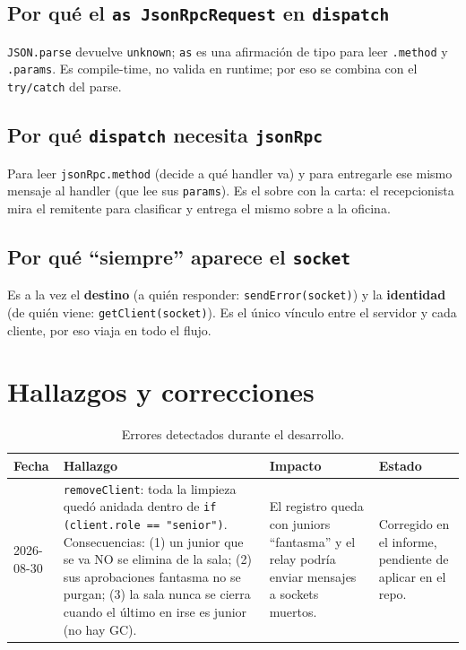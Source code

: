 \documentclass[11pt,a4paper]{article}
\begin{document}
\subsection{Por qué el \texttt{as JsonRpcRequest} en \texttt{dispatch}}
\texttt{JSON.parse} devuelve \texttt{unknown}; \texttt{as} es una afirmación de
tipo para leer \texttt{.method} y \texttt{.params}. Es compile-time, no valida
en runtime; por eso se combina con el \texttt{try/catch} del parse.

\subsection{Por qué \texttt{dispatch} necesita \texttt{jsonRpc}}
Para leer \texttt{jsonRpc.method} (decide a qué handler va) y para entregarle
ese mismo mensaje al handler (que lee sus \texttt{params}). Es el sobre con la
carta: el recepcionista mira el remitente para clasificar y entrega el mismo
sobre a la oficina.

\subsection{Por qué ``siempre'' aparece el \texttt{socket}}
Es a la vez el \textbf{destino} (a quién responder: \texttt{sendError(socket)})
y la \textbf{identidad} (de quién viene: \texttt{getClient(socket)}). Es el
único vínculo entre el servidor y cada cliente, por eso viaja en todo el flujo.

\section{Hallazgos y correcciones}
\label{sec:hallazgos}

\begin{table}[h]
  \centering
  \begin{tabular}{@{}p{2.4cm}p{6.4cm}p{2.4cm}p{2.6cm}@{}}
    \toprule
    \textbf{Fecha} & \textbf{Hallazgo} & \textbf{Impacto} & \textbf{Estado} \\
    \midrule
    2026-08-30 & \texttt{removeClient}: toda la limpieza quedó anidada dentro
                 de \texttt{if (client.role == "senior")}. Consecuencias:
                 (1) un junior que se va NO se elimina de la sala;
                 (2) sus aprobaciones fantasma no se purgan;
                 (3) la sala nunca se cierra cuando el último en irse es junior
                 (no hay GC). & El registro queda con juniors ``fantasma'' y el
                 relay podría enviar mensajes a sockets muertos. &
                 Corregido en el informe, pendiente de aplicar en el repo. \\
    \bottomrule
  \end{tabular}
  \caption{Errores detectados durante el desarrollo.}
\end{table}
\end{document}
